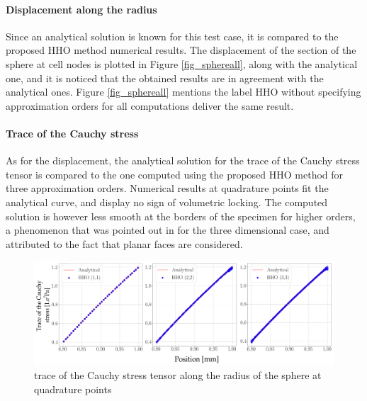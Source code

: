 \paragraph{Displacement along the radius}

Since an analytical solution is known for this test case, it is compared to the proposed HHO method numerical results. The displacement of the section of the sphere at cell nodes
is plotted in Figure \ref{fig_sphereall}, along with the analytical one, and it is noticed that the obtained results are in agreement with the analytical ones.
Figure \ref{fig_sphereall} mentions the label HHO without specifying approximation orders for all computations deliver the same result.

\paragraph{Trace of the Cauchy stress}

As for the displacement, the analytical solution for the trace of the Cauchy stress tensor is compared to the one computed using the proposed HHO method for three approximation orders.
Numerical results at quadrature points fit the analytical curve, and display no sign of volumetric locking. The computed solution is however less smooth
at the borders of the specimen for higher orders, a phenomenon that was pointed out in \cite{abbas_hybrid_2019-1} for the three dimensional case, and attributed to the fact that planar faces are considered.

\begin{figure}[H]
    \centering
    \includegraphics[width=15.cm]{../chapter_002_hho_mechanics/figures/sphere_pressures.png}
    \caption{trace of the Cauchy stress tensor along the radius of the sphere at quadrature points}
    \label{fig_sphere_pressure}
\end{figure}

